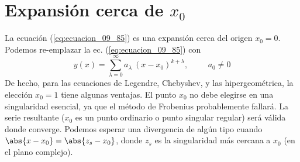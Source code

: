 \section*{Expansión cerca de $x_{0}$}
La ecuación (\ref{eq:ecuacion_09_85}) es una expansión cerca del origen $x_{0} = 0$. Podemos re-emplazar la ec. (\ref{eq:ecuacion_09_85}) con
\begin{equation}
y(x) = \sum_{\lambda=0}^{\infty} a_{\lambda} \: (x - x_{0})^{k + \lambda}, \hspace{1cm} a_{0} \neq 0
\label{eq:ecuacion_09_95}
\end{equation}
De hecho, para las ecuaciones de Legendre, Chebyshev, y las hipergeométrica, la elección $x_{0} = 1$ tiene algunas ventajas. El punto $x_{0}$ no debe elegirse en una singularidad esencial, ya que el método de Frobenius probablemente fallará. La serie resultante ($x_{0}$ es un punto ordinario o punto singular regular) será válida donde converge. Podemos esperar una divergencia de algún tipo cuando $\abs{x - x_{0}} = \abs{z_{s} - x_{0}}$, donde $z_{s}$ es la singularidad más cercana a $x_{0}$ (en el plano complejo).

